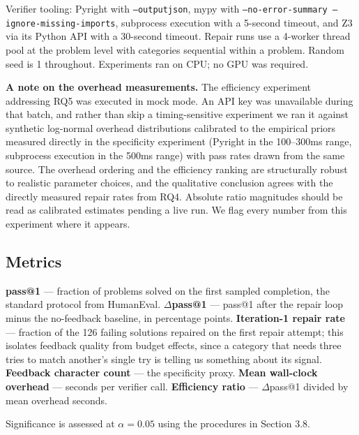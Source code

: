 Verifier tooling: Pyright with \texttt{--outputjson}, mypy with \texttt{--no-error-summary --ignore-missing-imports}, subprocess execution with a 5-second timeout, and Z3 via its Python API with a 30-second timeout. Repair runs use a 4-worker thread pool at the problem level with categories sequential within a problem. Random seed is 1 throughout. Experiments ran on CPU; no GPU was required.

\textbf{A note on the overhead measurements.} The efficiency experiment addressing RQ5 was executed in mock mode. An API key was unavailable during that batch, and rather than skip a timing-sensitive experiment we ran it against synthetic log-normal overhead distributions calibrated to the empirical priors measured directly in the specificity experiment (Pyright in the 100--300ms range, subprocess execution in the 500ms range) with pass rates drawn from the same source. The overhead ordering and the efficiency ranking are structurally robust to realistic parameter choices, and the qualitative conclusion agrees with the directly measured repair rates from RQ4. Absolute ratio magnitudes should be read as calibrated estimates pending a live run. We flag every number from this experiment where it appears.

\subsection{Metrics}

\textbf{pass@1} --- fraction of problems solved on the first sampled completion, the standard protocol from HumanEval. \textbf{$\Delta$pass@1} --- pass@1 after the repair loop minus the no-feedback baseline, in percentage points. \textbf{Iteration-1 repair rate} --- fraction of the 126 failing solutions repaired on the first repair attempt; this isolates feedback quality from budget effects, since a category that needs three tries to match another's single try is telling us something about its signal. \textbf{Feedback character count} --- the specificity proxy. \textbf{Mean wall-clock overhead} --- seconds per verifier call. \textbf{Efficiency ratio} --- $\Delta$pass@1 divided by mean overhead seconds.

Significance is assessed at $\alpha = 0.05$ using the procedures in Section 3.8.
